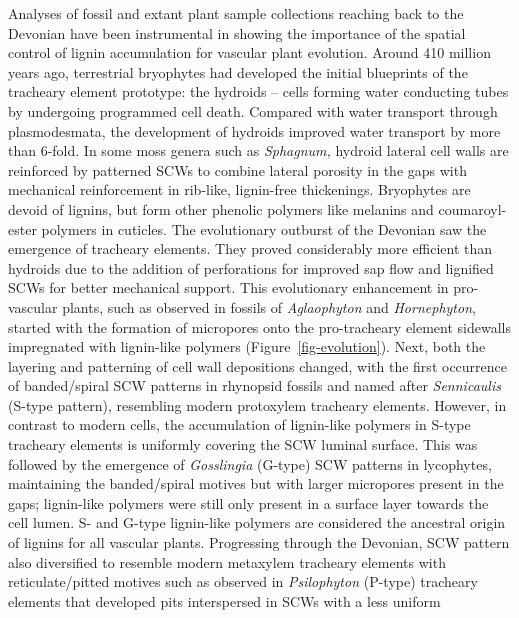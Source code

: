 \documentclass[journal=,manuscript=]{achemso}
\begin{document}
Analyses of fossil and extant plant sample collections reaching back to
the Devonian have been instrumental in showing the importance of the
spatial control of lignin accumulation for vascular plant evolution.
Around 410 million years ago, terrestrial bryophytes had developed the
initial blueprints of the tracheary element prototype: the hydroids --
cells forming water conducting tubes by undergoing programmed cell
death. Compared with water transport through plasmodesmata, the
development of hydroids improved water transport by more than
6-fold.\citep{Sperry2003} In some moss genera such as \emph{Sphagnum,}
hydroid lateral cell walls are reinforced by patterned SCWs to combine
lateral porosity in the gaps with mechanical reinforcement in rib-like,
lignin-free thickenings.\citep{Ligrone2000} Bryophytes are devoid of
lignins, but form other phenolic polymers like melanins and
coumaroyl-ester polymers in cuticles.\citep{Renault2017} The
evolutionary outburst of the Devonian saw the emergence of tracheary
elements. They proved considerably more efficient than hydroids due to
the addition of perforations for improved sap flow and lignified SCWs
for better mechanical support.\citep{Sperry2003} This evolutionary
enhancement in pro-vascular plants, such as observed in fossils of
\emph{Aglaophyton} and \emph{Hornephyton}, started with the formation of
micropores onto the pro-tracheary element sidewalls impregnated with
lignin-like polymers (Figure~\ref{fig-evolution}).\citep{Ligrone2000}
Next, both the layering and patterning of cell wall depositions changed,
with the first occurrence of banded/spiral SCW patterns in rhynopsid
fossils and named after \emph{Sennicaulis} (S-type pattern), resembling
modern protoxylem tracheary elements.\citep{Edwards2003} However, in
contrast to modern cells, the accumulation of lignin-like polymers in
S-type tracheary elements is uniformly covering the SCW luminal
surface.\citep{Edwards2003} This was followed by the emergence of
\emph{Gosslingia} (G-type) SCW patterns in lycophytes, maintaining the
banded/spiral motives but with larger micropores present in the gaps;
lignin-like polymers were still only present in a surface layer towards
the cell lumen.\citep{Edwards2003} S- and G-type lignin-like polymers
are considered the ancestral origin of lignins for all vascular plants.
Progressing through the Devonian, SCW pattern also diversified to
resemble modern metaxylem tracheary elements with reticulate/pitted
motives such as observed in \emph{Psilophyton} (P-type) tracheary
elements that developed pits interspersed in SCWs with a less uniform
\end{document}
